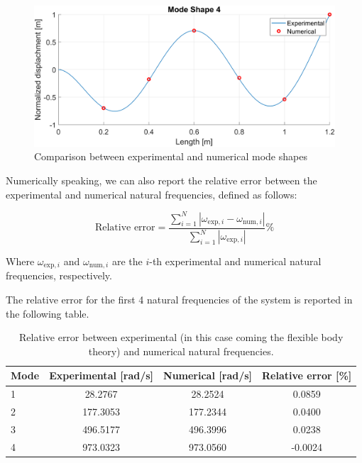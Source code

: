 \begin{figure}[H]
    \hfill
    \begin{minipage}[b]{0.45\textwidth}
        \centering
        \includegraphics[width=\textwidth]{img/MATLAB/Part_A/Comparison_ModeShape_04.png}
    \end{minipage}
    \caption{Comparison between experimental and numerical mode shapes}
    \label{fig:Mode_shapes_comparison}
\end{figure}

Numerically speaking, we can also report the relative error between the experimental and numerical natural frequencies, defined as follows:

\begin{equation}
    \text{Relative error} = \frac{\sum_{i=1}^{N} \left| \omega_{\text{exp},i} - \omega_{\text{num},i} \right|}{\sum_{i=1}^{N} \left| \omega_{\text{exp},i} \right|} \%
\end{equation}

Where $\omega_{\text{exp},i}$ and $\omega_{\text{num},i}$ are the $i$-th experimental and numerical natural frequencies, respectively.

The relative error for the first 4 natural frequencies of the system is reported in the following table.

\begin{table}[H]
    \centering
    \begin{tabular}{lccc}
        \hline
        Mode & Experimental [rad/s] & Numerical [rad/s] & Relative error [\%] \\
        \hline
        1    & 28.2767              & 28.2524           & 0.0859              \\
        2    & 177.3053             & 177.2344          & 0.0400              \\
        3    & 496.5177             & 496.3996          & 0.0238              \\
        4    & 973.0323             & 973.0560          & -0.0024             \\
        \hline
    \end{tabular}
    \caption{Relative error between experimental (in this case coming the flexible body theory) and numerical natural frequencies.}
    \label{tab:Relative_error_frequencies}
\end{table}
